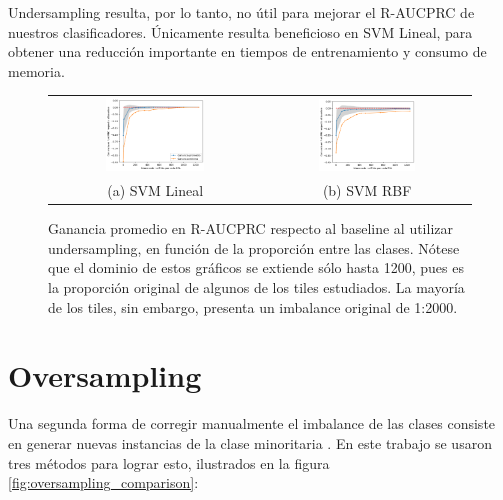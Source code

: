 Undersampling resulta, por lo tanto, no útil para mejorar el R-AUCPRC de nuestros clasificadores. Únicamente resulta beneficioso en SVM Lineal, para obtener una reducción importante en tiempos de entrenamiento y consumo de memoria.

\begin{figure}[h!]
\begin{tabular}{cc}
  \includegraphics[width=0.49\textwidth]{Kap7/linearBEST.png} &   \includegraphics[width=0.49\textwidth]{Kap7/rbfBEST.png} \\
(a) SVM Lineal& (b) SVM RBF
\end{tabular}
\caption{ Ganancia promedio en R-AUCPRC respecto al baseline al utilizar undersampling, en función de la proporción entre las clases. Nótese que el dominio de estos gráficos se extiende sólo hasta 1200, pues es la proporción original de algunos de los tiles estudiados. La mayoría de los tiles, sin embargo, presenta un imbalance original de 1:2000. }
\label{fig:overall_undersampling}
\end{figure}

\section{Oversampling}

Una segunda forma de corregir manualmente el imbalance de las clases consiste en generar nuevas instancias de la clase minoritaria \cite{he}. En este trabajo se usaron tres métodos para lograr esto, ilustrados en la figura \ref{fig:oversampling_comparison}:

